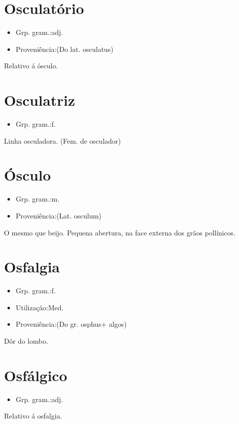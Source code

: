 \section{Osculatório}
\begin{itemize}
\item {Grp. gram.:adj.}
\end{itemize}
\begin{itemize}
\item {Proveniência:(Do lat. \textunderscore osculatus\textunderscore )}
\end{itemize}
Relativo á ósculo.
\section{Osculatriz}
\begin{itemize}
\item {Grp. gram.:f.}
\end{itemize}
Linha osculadora.
(Fem. de \textunderscore osculador\textunderscore )
\section{Ósculo}
\begin{itemize}
\item {Grp. gram.:m.}
\end{itemize}
\begin{itemize}
\item {Proveniência:(Lat. \textunderscore osculum\textunderscore )}
\end{itemize}
O mesmo que \textunderscore beijo\textunderscore .
Pequena abertura, na face externa dos grãos pollínicos.
\section{Osfalgia}
\begin{itemize}
\item {Grp. gram.:f.}
\end{itemize}
\begin{itemize}
\item {Utilização:Med.}
\end{itemize}
\begin{itemize}
\item {Proveniência:(Do gr. \textunderscore osphus\textunderscore  + \textunderscore algos\textunderscore )}
\end{itemize}
Dôr do lombo.
\section{Osfálgico}
\begin{itemize}
\item {Grp. gram.:adj.}
\end{itemize}
Relativo á osfalgia.
